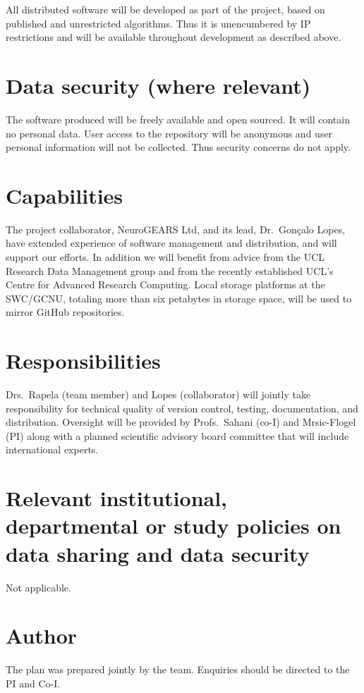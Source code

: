 \documentclass[a4paper,11pt]{article}
\begin{document}
All distributed software will be developed as part of the project, based on published and unrestricted algorithms.  Thus it is unencumbered by IP restrictions and will be available throughout development as described above.

\section{Data security (where relevant)}

The software produced will be freely available and open sourced.  It will contain no personal data.  User access to the repository will be anonymous and user personal information will not be collected.  Thus security concerns do not apply.

\section{Capabilities}

The project collaborator, NeuroGEARS Ltd, and its lead, Dr.~Gon\c{c}alo Lopes,
have extended experience of software management and distribution, and will
support our efforts. In addition we will benefit from advice from the UCL
Research Data Management group and from the recently established UCL's Centre
for Advanced Research Computing. Local storage platforms at the SWC/GCNU,
totaling more than six petabytes in storage space, will be used to mirror                                                                            
GitHub repositories.

\section{Responsibilities}

Drs.~Rapela (team member) and Lopes (collaborator) will jointly take responsibility for technical quality of version control, testing, documentation, and distribution.  Oversight will be provided by Profs.~Sahani (co-I) and Mrsic-Flogel (PI) along with a planned scientific advisory board committee that will include international experts.


\section{Relevant institutional, departmental or study policies on data sharing and data security}

Not applicable.

\section{Author}

The plan was prepared jointly by the team.  Enquiries should be directed to the PI and Co-I.
\end{document}
